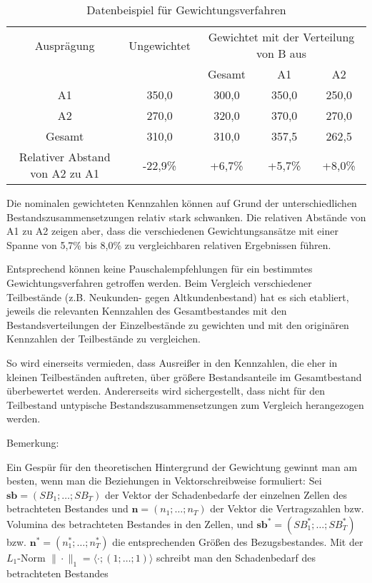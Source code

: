 \begin{table}
 \caption{Datenbeispiel für Gewichtungsverfahren}
 \footnotesize %

\begin{center}
\begin{tabular}{c|c|ccc}
Ausprägung & Ungewichtet  & \multicolumn{3}{c}{Gewichtet mit der Verteilung von B aus}     \\
                &                   &  Gesamt  & A1 & A2   \\ \hline

A1     & 350,0  & 300,0  & 350,0 & 250,0 \\
A2     & 270,0  & 320,0  & 370,0 & 270,0 \\ \hline
Gesamt & 310,0 & 310,0 & 357,5 & 262,5 \\ \hline \hline
Relativer Abstand von A2 zu A1 &-22,9\% & +6,7\% & +5,7\% & +8,0\% \\

\end{tabular}
\end{center}

\label{tab:Gewichtung}
 \end{table}


Die nominalen gewichteten Kennzahlen können auf Grund der unterschiedlichen Bestandszusammensetzungen relativ stark schwanken. Die relativen Abstände von A1 zu A2 zeigen aber, dass die verschiedenen Gewichtungsansätze mit einer Spanne von 5,7\% bis 8,0\% zu vergleichbaren relativen Ergebnissen führen.

Entsprechend können keine Pauschalempfehlungen für ein bestimmtes Gewichtungsverfahren getroffen werden. Beim Vergleich verschiedener Teilbestände (z.B. Neukunden- gegen Altkundenbestand) hat es sich etabliert, jeweils die relevanten Kennzahlen des Gesamtbestandes mit den Bestandsverteilungen der Einzelbestände zu gewichten und mit den originären Kennzahlen der Teilbestände zu vergleichen.

So wird einerseits vermieden, dass Ausreißer in den Kennzahlen, die eher in kleinen Teilbeständen auftreten, über größere Bestandsanteile im Gesamtbestand überbewertet werden. Andererseits wird sichergestellt, dass nicht für den Teilbestand untypische Bestandszusammensetzungen zum Vergleich herangezogen werden.

Bemerkung:

Ein Gespür für den theoretischen Hintergrund der Gewichtung gewinnt man am besten, wenn man die Beziehungen in Vektorschreibweise formuliert:
Sei $\mathbf{sb} = (SB_1; \ldots ; SB_T)$  der Vektor der Schadenbedarfe der einzelnen Zellen des betrachteten Bestandes und  $\mathbf{n} = (n_1; \ldots ; n_T)$  der Vektor die Vertragszahlen bzw. Volumina des betrachteten Bestandes in den Zellen, und $\mathbf{sb}^* = (SB_1^*; \ldots ; SB_T^*)$  bzw.   $\mathbf{n}^* = (n_1^*; \ldots ; n_T^*)$ die entsprechenden Größen des Bezugsbestandes. Mit der $L_1$-Norm $\|\cdot\|_1=\langle\cdot;(1;\ldots;1)\rangle$  schreibt man den Schadenbedarf des betrachteten Bestandes

